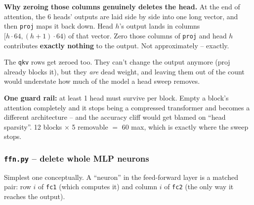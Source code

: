 \documentclass[11pt]{article}
\newcommand{\code}[1]{\texttt{\small #1}}
\begin{document}
\begin{center}
\end{center}

\textbf{Why zeroing those columns genuinely deletes the head.} At the end of
attention, the 6 heads' outputs are laid side by side into one long vector, and
then \code{proj} maps it back down. Head $h$'s output lands in columns
$[h \cdot 64, (h{+}1)\cdot 64)$ of that vector. Zero those columns of
\code{proj} and head $h$ contributes \textbf{exactly nothing} to the output.
Not approximately -- exactly.

The \code{qkv} rows get zeroed too. They can't change the output anymore (proj
already blocks it), but they \emph{are} dead weight, and leaving them out of the
count would understate how much of the model a head sweep removes.

\textbf{One guard rail:} at least 1 head must survive per block. Empty a block's
attention completely and it stops being a compressed transformer and becomes a
different architecture -- and the accuracy cliff would get blamed on ``head
sparsity''. 12 blocks $\times$ 5 removable $=$ 60 max, which is exactly where
the sweep stops.

\subsubsection*{\texttt{ffn.py} -- delete whole MLP neurons}

Simplest one conceptually. A ``neuron'' in the feed-forward layer is a matched
pair: row $i$ of \code{fc1} (which computes it) and column $i$ of \code{fc2}
(the only way it reaches the output).
\end{document}
